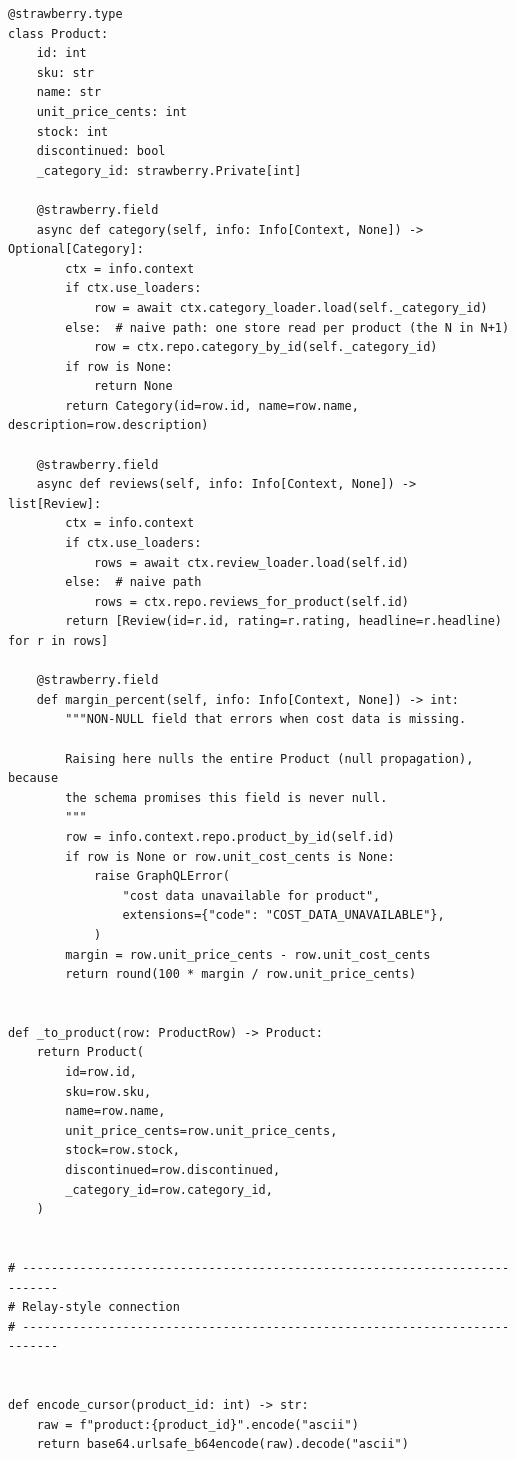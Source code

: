 \begin{verbatim}
@strawberry.type
class Product:
    id: int
    sku: str
    name: str
    unit_price_cents: int
    stock: int
    discontinued: bool
    _category_id: strawberry.Private[int]

    @strawberry.field
    async def category(self, info: Info[Context, None]) -> Optional[Category]:
        ctx = info.context
        if ctx.use_loaders:
            row = await ctx.category_loader.load(self._category_id)
        else:  # naive path: one store read per product (the N in N+1)
            row = ctx.repo.category_by_id(self._category_id)
        if row is None:
            return None
        return Category(id=row.id, name=row.name, description=row.description)

    @strawberry.field
    async def reviews(self, info: Info[Context, None]) -> list[Review]:
        ctx = info.context
        if ctx.use_loaders:
            rows = await ctx.review_loader.load(self.id)
        else:  # naive path
            rows = ctx.repo.reviews_for_product(self.id)
        return [Review(id=r.id, rating=r.rating, headline=r.headline) for r in rows]

    @strawberry.field
    def margin_percent(self, info: Info[Context, None]) -> int:
        """NON-NULL field that errors when cost data is missing.

        Raising here nulls the entire Product (null propagation), because
        the schema promises this field is never null.
        """
        row = info.context.repo.product_by_id(self.id)
        if row is None or row.unit_cost_cents is None:
            raise GraphQLError(
                "cost data unavailable for product",
                extensions={"code": "COST_DATA_UNAVAILABLE"},
            )
        margin = row.unit_price_cents - row.unit_cost_cents
        return round(100 * margin / row.unit_price_cents)


def _to_product(row: ProductRow) -> Product:
    return Product(
        id=row.id,
        sku=row.sku,
        name=row.name,
        unit_price_cents=row.unit_price_cents,
        stock=row.stock,
        discontinued=row.discontinued,
        _category_id=row.category_id,
    )


# ---------------------------------------------------------------------------
# Relay-style connection
# ---------------------------------------------------------------------------


def encode_cursor(product_id: int) -> str:
    raw = f"product:{product_id}".encode("ascii")
    return base64.urlsafe_b64encode(raw).decode("ascii")



\end{verbatim}
